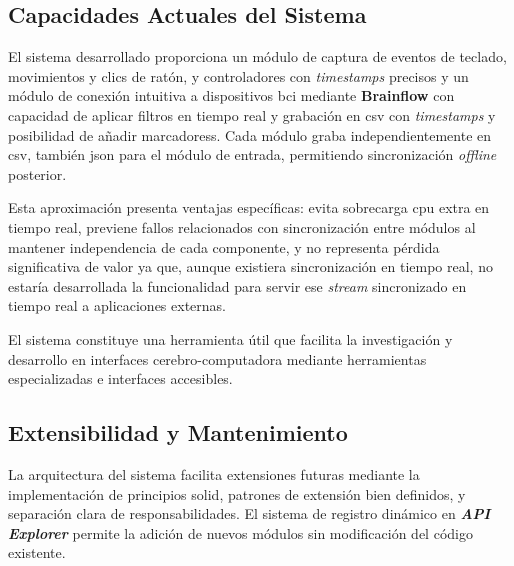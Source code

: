 \subsection{Capacidades Actuales del Sistema}
\label{subsec:capacidades_actuales_sistema}

El sistema desarrollado proporciona un módulo de captura de eventos de teclado, movimientos y clics de ratón, y controladores con \textit{\glspl{timestamp}} precisos y un módulo de conexión intuitiva a dispositivos \acrshort{bci} mediante \textbf{Brainflow} con capacidad de aplicar filtros en tiempo real y grabación en \acrshort{csv} con \textit{\glspl{timestamp}} y posibilidad de añadir \glspl{marcadores}. Cada módulo graba independientemente en \acrshort{csv}, también \acrshort{json} para el módulo de entrada, permitiendo sincronización \textit{offline} posterior.

Esta aproximación presenta ventajas específicas: evita sobrecarga \acrshort{cpu} extra en tiempo real, previene fallos relacionados con sincronización entre módulos al mantener independencia de cada componente, y no representa pérdida significativa de valor ya que, aunque existiera sincronización en tiempo real, no estaría desarrollada la funcionalidad para servir ese \textit{\gls{stream}} sincronizado en tiempo real a aplicaciones externas.

El sistema constituye una herramienta útil que facilita la investigación y desarrollo en interfaces cerebro-computadora mediante herramientas especializadas e interfaces accesibles.

\subsection{Extensibilidad y Mantenimiento}
\label{subsec:extensibilidad_mantenimiento}

La arquitectura del sistema facilita extensiones futuras mediante la implementación de principios \acrshort{solid}, patrones de extensión bien definidos, y separación clara de responsabilidades. El sistema de registro dinámico en \textit{\textbf{API Explorer}} permite la adición de nuevos módulos sin modificación del código existente.